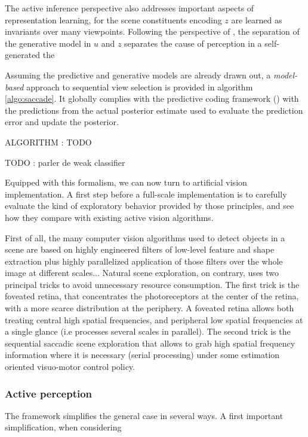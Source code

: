 \documentclass{article} %
\begin{document}
The active inference perspective also addresses important aspects of representation learning, for the scene constituents encoding $z$ are learned as invariants over many viewpoints. Following the   perspective of \cite{bengio2017independently}, the separation of the generative model in $u$ and $z$ separates the cause of perception in a self-generated  the 


Assuming the predictive and generative models are already drawn out, a \emph{model-based} approach to sequential view selection is provided in algorithm \ref{algo:saccade}. It globally complies with the predictive coding framework (\cite{rao1999predictive}) with the predictions from the actual posterior estimate used to evaluate the prediction error and update the posterior.

{\color{magenta} ALGORITHM : TODO}

TODO : parler de weak classifier  

Equipped with this formalism, we can now turn to artificial vision implementation. 
A first step before a full-scale implementation is to carefully evaluate the kind of exploratory behavior provided by those principles, and see how they compare with existing active vision algorithms. 

{\color{blue}First of all, the many computer vision algorithms used to detect objects in a scene are based on highly engineered filters of low-level feature and shape extraction plus highly parallelized application of those filters over the whole image at different scales... Natural scene exploration, on contrary, uses two principal tricks to avoid unnecessary resource consumption. The first trick is the foveated retina, that concentrates the photoreceptors at the center of the retina, with a more scarce distribution at the periphery. A foveated retina allows both treating central high spatial frequencies, and peripheral low spatial frequencies at a single glance (i.e processes several scales in parallel). The second trick is the sequential saccadic scene exploration that allows to grab high spatial frequency information where it is necessary (serial processing) under some estimation oriented visuo-motor control policy. }





\subsubsection{Active perception}

The framework simplifies the general case in several ways. A first important simplification, when considering 
\end{document}
